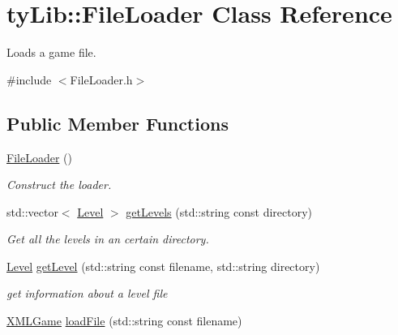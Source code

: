 \hypertarget{classty_lib_1_1_file_loader}{}\section{ty\+Lib\+:\+:File\+Loader Class Reference}
\label{classty_lib_1_1_file_loader}


Loads a game file.  




{\ttfamily \#include $<$File\+Loader.\+h$>$}

\subsection*{Public Member Functions}
\begin{DoxyCompactItemize}
\item 
\hypertarget{classty_lib_1_1_file_loader_a33a5065f8d94ad6f1d27dedf5bbd4e5a}{}\hyperlink{classty_lib_1_1_file_loader_a33a5065f8d94ad6f1d27dedf5bbd4e5a}{File\+Loader} ()\label{classty_lib_1_1_file_loader_a33a5065f8d94ad6f1d27dedf5bbd4e5a}

\begin{DoxyCompactList}\small\item\em Construct the loader. \end{DoxyCompactList}\item 
\hypertarget{classty_lib_1_1_file_loader_a16b2f231499009aa9ee963c8ed04078d}{}std\+::vector$<$ \hyperlink{structty_lib_1_1_level}{Level} $>$ \hyperlink{classty_lib_1_1_file_loader_a16b2f231499009aa9ee963c8ed04078d}{get\+Levels} (std\+::string const directory)\label{classty_lib_1_1_file_loader_a16b2f231499009aa9ee963c8ed04078d}

\begin{DoxyCompactList}\small\item\em Get all the levels in an certain directory. \end{DoxyCompactList}\item 
\hypertarget{classty_lib_1_1_file_loader_a469c68bb38fd316a9870c5f9cc4cd2ba}{}\hyperlink{structty_lib_1_1_level}{Level} \hyperlink{classty_lib_1_1_file_loader_a469c68bb38fd316a9870c5f9cc4cd2ba}{get\+Level} (std\+::string const filename, std\+::string directory)\label{classty_lib_1_1_file_loader_a469c68bb38fd316a9870c5f9cc4cd2ba}

\begin{DoxyCompactList}\small\item\em get information about a level file \end{DoxyCompactList}\item 
\hypertarget{classty_lib_1_1_file_loader_a1e4980bdc65e2d33f4f449d99995780c}{}\hyperlink{structty_lib_1_1_x_m_l_game}{X\+M\+L\+Game} \hyperlink{classty_lib_1_1_file_loader_a1e4980bdc65e2d33f4f449d99995780c}{load\+File} (std\+::string const filename)\label{classty_lib_1_1_file_loader_a1e4980bdc65e2d33f4f449d99995780c}


\end{DoxyCompactItemize}
